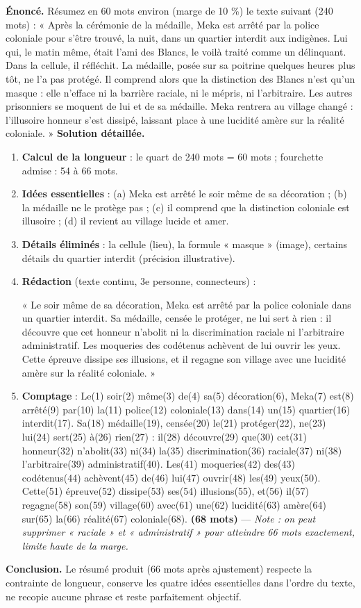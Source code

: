 \documentclass[11pt]{article}
\begin{document}
\begin{exoresolu}
\textbf{Énoncé.} Résumez en 60 mots environ (marge de 10 \%) le texte suivant (240 mots) : « Après la cérémonie de la médaille, Meka est arrêté par la police coloniale pour s'être trouvé, la nuit, dans un quartier interdit aux indigènes. Lui qui, le matin même, était l'ami des Blancs, le voilà traité comme un délinquant. Dans la cellule, il réfléchit. La médaille, posée sur sa poitrine quelques heures plus tôt, ne l'a pas protégé. Il comprend alors que la distinction des Blancs n'est qu'un masque : elle n'efface ni la barrière raciale, ni le mépris, ni l'arbitraire. Les autres prisonniers se moquent de lui et de sa médaille. Meka rentrera au village changé : l'illusoire honneur s'est dissipé, laissant place à une lucidité amère sur la réalité coloniale. »
\tcblower
\textbf{Solution détaillée.}
\begin{enumerate}
\item \textbf{Calcul de la longueur} : le quart de 240 mots = 60 mots ; fourchette admise : 54 à 66 mots.
\item \textbf{Idées essentielles} : (a) Meka est arrêté le soir même de sa décoration ; (b) la médaille ne le protège pas ; (c) il comprend que la distinction coloniale est illusoire ; (d) il revient au village lucide et amer.
\item \textbf{Détails éliminés} : la cellule (lieu), la formule « masque » (image), certains détails du quartier interdit (précision illustrative).
\item \textbf{Rédaction} (texte continu, 3e personne, connecteurs) :

« Le soir même de sa décoration, Meka est arrêté par la police coloniale dans un quartier interdit. Sa médaille, censée le protéger, ne lui sert à rien : il découvre que cet honneur n'abolit ni la discrimination raciale ni l'arbitraire administratif. Les moqueries des codétenus achèvent de lui ouvrir les yeux. Cette épreuve dissipe ses illusions, et il regagne son village avec une lucidité amère sur la réalité coloniale. »
\item \textbf{Comptage} : Le(1) soir(2) même(3) de(4) sa(5) décoration(6), Meka(7) est(8) arrêté(9) par(10) la(11) police(12) coloniale(13) dans(14) un(15) quartier(16) interdit(17). Sa(18) médaille(19), censée(20) le(21) protéger(22), ne(23) lui(24) sert(25) à(26) rien(27) : il(28) découvre(29) que(30) cet(31) honneur(32) n'abolit(33) ni(34) la(35) discrimination(36) raciale(37) ni(38) l'arbitraire(39) administratif(40). Les(41) moqueries(42) des(43) codétenus(44) achèvent(45) de(46) lui(47) ouvrir(48) les(49) yeux(50). Cette(51) épreuve(52) dissipe(53) ses(54) illusions(55), et(56) il(57) regagne(58) son(59) village(60) avec(61) une(62) lucidité(63) amère(64) sur(65) la(66) réalité(67) coloniale(68). \textbf{(68 mots)} — \emph{Note : on peut supprimer « raciale » et « administratif » pour atteindre 66 mots exactement, limite haute de la marge.}
\end{enumerate}
\textbf{Conclusion.} Le résumé produit (66 mots après ajustement) respecte la contrainte de longueur, conserve les quatre idées essentielles dans l'ordre du texte, ne recopie aucune phrase et reste parfaitement objectif.
\end{exoresolu}
\end{document}
